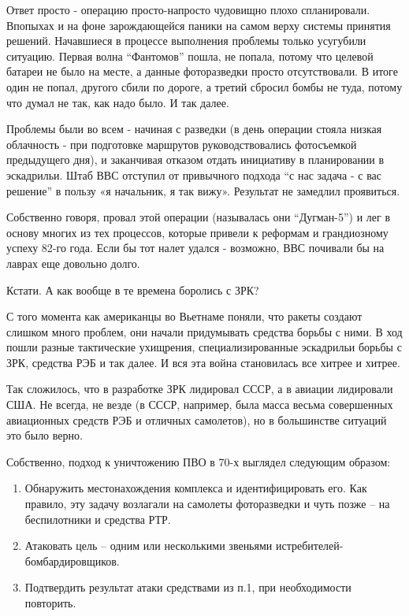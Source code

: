 Ответ просто - операцию просто-напросто чудовищно плохо спланировали. Впопыхах и на фоне зарождающейся паники на самом верху системы принятия решений. Начавшиеся в процессе выполнения проблемы только усугубили ситуацию. Первая волна “Фантомов” пошла, не попала, потому что целевой батареи не было на месте, а данные фоторазведки просто отсутствовали. В итоге один не попал, другого сбили по дороге, а третий сбросил бомбы не туда, потому что думал не так, как надо было. И так далее.

Проблемы были во всем - начиная с разведки (в день операции стояла низкая облачность - при подготовке маршрутов руководствовались фотосъемкой предыдущего дня), и заканчивая отказом отдать инициативу в планировании в эскадрильи. Штаб ВВС отступил от привычного подхода “с нас задача - с вас решение” в пользу «я начальник, я так вижу». Результат не замедлил проявиться.

Собственно говоря, провал этой операции (называлась они “Дугман-5”) и лег в основу многих из тех процессов, которые привели к реформам и грандиозному успеху 82-го года. Если бы тот налет удался - возможно, ВВС почивали бы на лаврах еще довольно долго.

Кстати. А как вообще в те времена боролись с ЗРК?

С того момента как американцы во Вьетнаме поняли, что ракеты создают слишком много проблем, они начали придумывать средства борьбы с ними. В ход пошли разные тактические ухищрения, специализированные эскадрильи борьбы с ЗРК, средства РЭБ и так далее. И вся эта война становилась все хитрее и хитрее.

Так сложилось, что в разработке ЗРК лидировал СССР, а в авиации лидировали США. Не всегда, не везде (в СССР, например, была масса весьма совершенных авиационных средств РЭБ и отличных самолетов), но в большинстве ситуаций это было верно.

Собственно, подход к уничтожению ПВО в 70-х выглядел следующим образом: 
\begin{enumerate}
	\item Обнаружить местонахождения комплекса и идентифицировать его. Как правило, эту задачу возлагали на самолеты фоторазведки и чуть позже – на беспилотники и средства РТР.
	\item Атаковать цель – одним или несколькими звеньями истребителей-бомбардировщиков.
	\item Подтвердить результат атаки средствами из п.1, при необходимости повторить.
\end{enumerate}

